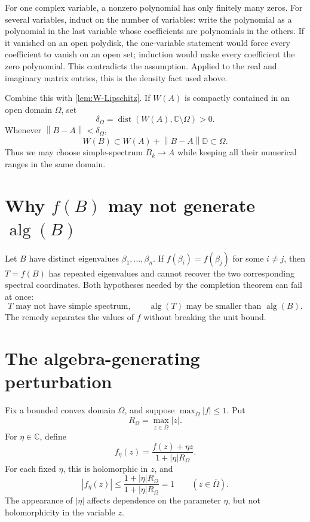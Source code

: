 \documentclass[11pt,oneside,openany]{book}
\theoremstyle{definition}
\theoremstyle{remark}
\newcommand{\C}{\mathbb C}
\newcommand{\D}{\mathbb D}
\newcommand{\alg}{\operatorname{alg}}
\newcommand{\dist}{\operatorname{dist}}
\newcommand{\norm}[1]{\left\lVert #1\right\rVert}
\newcommand{\olD}{\overline{\D}}
\begin{document}
\begin{blackbox}
For one complex variable, a nonzero polynomial has only finitely many
zeros.  For several variables, induct on the number of variables:
write the polynomial as a polynomial in the last variable whose
coefficients are polynomials in the others.  If it vanished on an open
polydisk, the one-variable statement would force every coefficient to
vanish on an open set; induction would make every coefficient the zero
polynomial.  This contradicts the assumption.  Applied to the real and
imaginary matrix entries, this is the density fact used above.
\end{blackbox}

Combine this with \cref{lem:W-Lipschitz}.  If
\(W(A)\) is compactly contained in an open domain \(\Omega\), set
\[
  \delta_\Omega=\dist(W(A),\C\setminus\Omega)>0.
\]
Whenever \(\norm{B-A}<\delta_\Omega\),
\[
  W(B)\subset W(A)+\norm{B-A}\olD\subset\Omega.
\]
Thus we may choose simple-spectrum \(B_k\to A\) while keeping all
their numerical ranges in the same domain.

\section{Why \texorpdfstring{\(f(B)\)}{f(B)} may not generate
\texorpdfstring{\(\alg(B)\)}{alg(B)}}

Let \(B\) have distinct eigenvalues
\(\beta_1,\ldots,\beta_n\).  If \(f(\beta_i)=f(\beta_j)\) for some
\(i\neq j\), then \(T=f(B)\) has repeated eigenvalues and cannot
recover the two corresponding spectral coordinates.  Both hypotheses
needed by the completion theorem can fail at once:
\[
  T\text{ may not have simple spectrum},\qquad
  \alg(T)\text{ may be smaller than }\alg(B).
\]
The remedy separates the values of \(f\) without breaking the unit
bound.

\section{The algebra-generating perturbation}

Fix a bounded convex domain \(\Omega\), and suppose
\(\max_{\overline\Omega}|f|\leq1\).  Put
\[
  R_\Omega=\max_{z\in\overline\Omega}|z|.
\]
For \(\eta\in\C\), define
\begin{equation}
  f_\eta(z)=
  \frac{f(z)+\eta z}{1+|\eta|R_\Omega}.
  \label{eq:feta}
\end{equation}
For each fixed \(\eta\), this is holomorphic in \(z\), and
\[
  |f_\eta(z)|
  \leq\frac{1+|\eta|R_\Omega}
             {1+|\eta|R_\Omega}
  =1
  \qquad(z\in\overline\Omega).
\]
The appearance of \(|\eta|\) affects dependence on the parameter
\(\eta\), but not holomorphicity in the variable \(z\).
\end{document}
